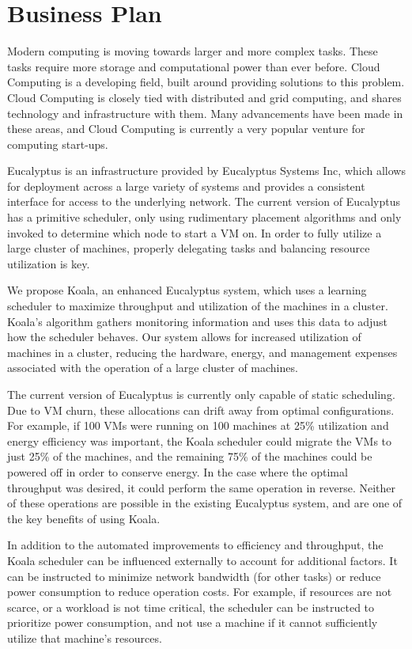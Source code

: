 \section{Business Plan}
\label{sec:bizplan}
  Modern computing is moving towards larger and more complex tasks.  These tasks require more storage and computational power than ever before.  Cloud Computing is a developing field, built around providing solutions to this problem.  Cloud Computing is closely tied with distributed and grid computing, and shares technology and infrastructure with them.  Many advancements have been made in these areas, and Cloud Computing is currently a very popular venture for computing start-ups.

  Eucalyptus is an infrastructure provided by Eucalyptus Systems Inc, which allows for deployment across a large variety of systems and provides a consistent interface for access to the underlying network.  The current version of Eucalyptus has a primitive scheduler, only using rudimentary placement algorithms and only invoked to determine which node to start a VM on.  In order to fully utilize a large cluster of machines, properly delegating tasks and balancing resource utilization is key.

  We propose Koala, an enhanced Eucalyptus system, which uses a learning scheduler to maximize throughput and utilization of the machines in a cluster.  Koala's algorithm gathers monitoring information and uses this data to adjust how the scheduler behaves.  Our system allows for increased utilization of machines in a cluster, reducing the hardware, energy, and management expenses associated with the operation of a large cluster of machines.

  The current version of Eucalyptus is currently only capable of static scheduling.  Due to VM churn, these allocations can drift away from optimal configurations.  For example, if 100 VMs were running on 100 machines at 25\% utilization and energy efficiency was important, the Koala scheduler could migrate the VMs to just 25\% of the machines, and the remaining 75\% of the machines could be powered off in order to conserve energy.  In the case where the optimal throughput was desired, it could perform the same operation in reverse.  Neither of these operations are possible in the existing Eucalyptus system, and are one of the key benefits of using Koala.

  In addition to the automated improvements to efficiency and throughput, the Koala scheduler can be influenced externally to account for additional factors.  It can be instructed to minimize network bandwidth (for other tasks) or reduce power consumption to reduce operation costs.  For example, if resources are not scarce, or a workload is not time critical, the scheduler can be instructed to prioritize power consumption, and not use a machine if it cannot sufficiently utilize that machine's resources.


